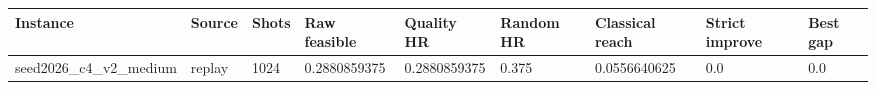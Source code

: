 \begin{tabular}{lllllllll}
\toprule
Instance & Source & Shots & Raw feasible & Quality HR & Random HR & Classical reach & Strict improve & Best gap \\
\midrule
seed2026\_c4\_v2\_medium & replay & 1024 & 0.2880859375 & 0.2880859375 & 0.375 & 0.0556640625 & 0.0 & 0.0 \\
\bottomrule
\end{tabular}
